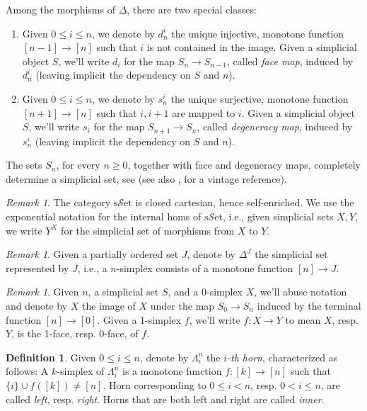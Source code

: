 \documentclass[a4paper]{book}
\newcommand{\lS}{\mathcal{S}}
\newcommand{\set}{\lS\mathrm{et}} %
\newcommand{\sset}{\mathrm{s}\set} %
\theoremstyle{definition}
\newtheorem{definition}[equation]{Definition}
\theoremstyle{remark}
\newtheorem{remark}[equation]{Remark}
\numberwithin{equation}{section}
\begin{document}
Among the morphisms of $\Delta$, there are two special classes: 
\begin{enumerate}
	\item Given $0\leq i\leq n$, we denote by $d^i_n$ the unique injective, monotone function $[n-1]\to[n]$ such that $i$ is not contained in the image. Given a simplicial object $S$, we'll write $d_i$ for the map $S_n\to S_{n-1}$, called \emph{face map}, induced by $d^i_n$ (leaving implicit the dependency on $S$ and $n$).
	\item Given $0\leq i\leq n$, we denote by $s^i_n$ the unique surjective, monotone function $[n+1]\to[n]$ such that $i,i+1$ are mapped to $i$. Given a simplicial object $S$, we'll write $s_i$ for the map $S_{n+1}\to S_n$, called \emph{degeneracy map}, induced by $s^i_n$ (leaving implicit the dependency on $S$ and $n$). 
\end{enumerate}The sets $S_n$, for every $n\geq0$, together with face and degeneracy maps, completely determine a simplicial set, see \cite[Tag 04FW]{kerodon2026} (see also \cite[\S VII.5, Proposition 2]{maclane1998categories}, for a vintage reference). 
\begin{remark}
	The category $\sset$ is closed cartesian, hence self-enriched. We use the exponential notation for the internal homs of $\sset$, i.e., given simplicial sets $X,Y$, we write $Y^X$ for the simplicial set of morphisms from $X$ to $Y$. 
\end{remark}
\begin{remark}
	Given a partially ordered set $J$, denote by $\Delta^J$ the simplicial set represented by $J$, i.e., a $n$-simplex consists of a monotone function $[n]\to J$.  
\end{remark}
\begin{remark}
Given $n$, a simplicial set $S$, and a $0$-simplex $X$, we'll abuse notation and denote by $X$ the image of $X$ under the map $S_0\to S_n$ induced by the terminal function $[n]\to[0]$. Given a 1-simplex $f$, we'll write $f:X\to Y$ to mean $X$, resp. $Y$, is the 1-face, resp. 0-face, of $f$.
\end{remark}
\begin{definition}
	Given $0\leq i\leq n$, denote by $\Lambda^n_i$ the \emph{$i$-th horn}, characterized as follows: A $k$-simplex of $\Lambda^n_i$ is a monotone function $f:[k]\to[n]$ such that $\{i\}\cup f([k])\neq[n]$. Horn corresponding to $0\leq i<n$, resp. $0<i\leq n$, are called \emph{left}, resp. \emph{right}. Horns that are both left and right are called \emph{inner}. 
\end{definition}
\end{document}
